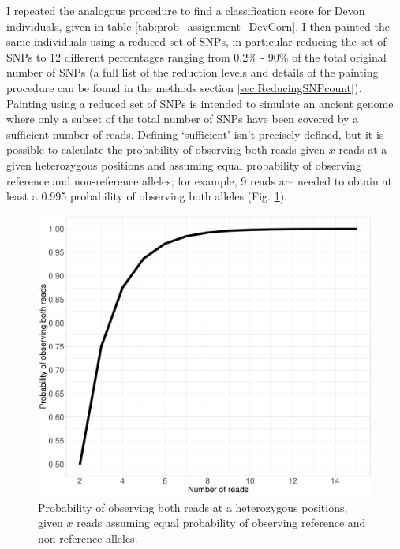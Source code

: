 {I repeated the analogous procedure to find a classification score for Devon individuals, given in table \ref{tab:prob_assignment_DevCorn}. I then painted the same individuals using a reduced set of SNPs, in particular reducing the set of SNPs to 12 different percentages ranging from 0.2\% - 90\% of the total original number of SNPs (a full list of the reduction levels and details of the painting procedure can be found in the methods section \ref{sec:ReducingSNPcount}). Painting using a reduced set of SNPs is intended to simulate an ancient genome where only a subset of the total number of SNPs have been covered by a sufficient number of reads. Defining `sufficient' isn't precisely defined, but it is possible to calculate the probability of observing both reads given $x$ reads at a given heterozygous positions and assuming equal probability of observing reference and non-reference alleles; for example, 9 reads are needed to obtain at least a 0.995 probability of observing both alleles (Fig. \ref{fig:ProbabilityHetReads}).

\begin{figure}[htp]
    \centering
    \includegraphics[width=1.0\textwidth]{../images/chapter1/het_prob.pdf}
    \caption{Probability of observing both reads at a heterozygous positions, given $x$ reads assuming equal probability of observing reference and non-reference alleles.}
    \label{fig:ProbabilityHetReads}
\end{figure}


}

